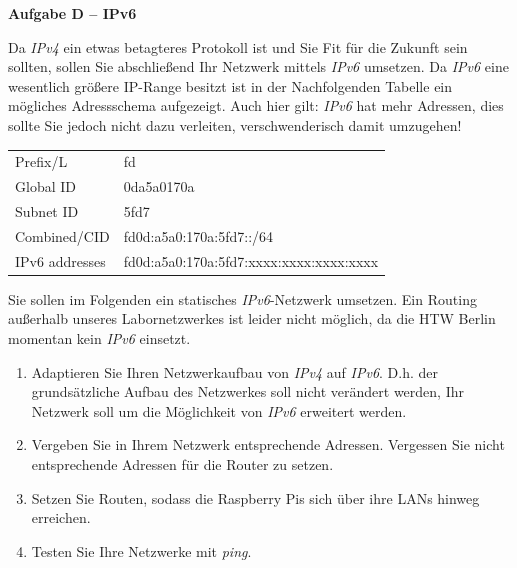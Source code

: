 \documentclass[paper=a4,fontsize=11pt]{scrartcl}%
\numberwithin{equation}{section}
\begin{document}
\begin{enumerate}
\begin{center}\Large{\textbf{Aufgabe D -- IPv6}}\end{center}\vskip0.25in
Da \emph{IPv4} ein etwas betagteres Protokoll ist und Sie Fit für die Zukunft sein sollten, sollen Sie abschließend Ihr Netzwerk mittels \emph{IPv6} umsetzen. Da \emph{IPv6} eine wesentlich größere IP-Range besitzt ist in der Nachfolgenden Tabelle ein mögliches Adressschema aufgezeigt. Auch hier gilt: \emph{IPv6} hat mehr Adressen, dies sollte Sie jedoch nicht dazu verleiten, verschwenderisch damit umzugehen!
\begin{table}[H]
\centering
\begin{tabular}{ll}
 Prefix/L & fd  \\
 Global ID & 0da5a0170a \\
 Subnet ID &  5fd7\\
 Combined/CID & fd0d:a5a0:170a:5fd7::/64 \\
 IPv6 addresses & fd0d:a5a0:170a:5fd7:xxxx:xxxx:xxxx:xxxx 
\end{tabular}
\end{table}
Sie sollen im Folgenden ein statisches \emph{IPv6}-Netzwerk umsetzen. Ein Routing außerhalb unseres Labornetzwerkes ist leider nicht möglich, da die HTW Berlin momentan kein \emph{IPv6} einsetzt.
\begin{enumerate}
	\item Adaptieren Sie Ihren Netzwerkaufbau von \emph{IPv4} auf \emph{IPv6}. D.h. der grundsätzliche Aufbau des Netzwerkes soll nicht verändert werden, Ihr Netzwerk soll um die Möglichkeit von \emph{IPv6} erweitert werden.
	\item Vergeben Sie in Ihrem Netzwerk entsprechende Adressen. Vergessen Sie nicht entsprechende Adressen für die Router zu setzen.
	\item Setzen Sie Routen, sodass die Raspberry Pis sich über ihre LANs hinweg erreichen.
	\item Testen Sie Ihre Netzwerke mit \emph{ping}.
\end{enumerate}


\end{enumerate}
\end{document}
